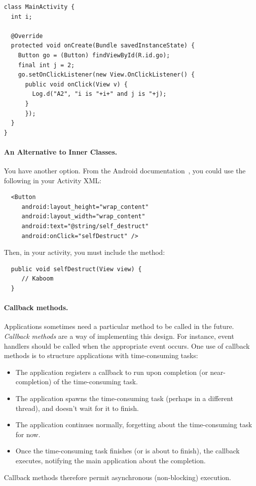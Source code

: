 {\small
\begin{verbatim}
class MainActivity {
  int i;

  @Override
  protected void onCreate(Bundle savedInstanceState) {
    Button go = (Button) findViewById(R.id.go);
    final int j = 2;
    go.setOnClickListener(new View.OnClickListener() {
      public void onClick(View v) {
        Log.d("A2", "i is "+i+" and j is "+j);
      }
      }); 
  }
}
\end{verbatim}
}

\paragraph{An Alternative to Inner Classes.}
You have another option. From the Android documentation~\cite{android:button}, you could use the following
in your Activity XML:
\begin{verbatim}
  <Button
     android:layout_height="wrap_content"
     android:layout_width="wrap_content"
     android:text="@string/self_destruct"
     android:onClick="selfDestruct" />
\end{verbatim}

Then, in your activity, you must include the method:
\begin{verbatim}
  public void selfDestruct(View view) {
     // Kaboom
  }
\end{verbatim}

\paragraph{Callback methods.} Applications sometimes need a particular
method to be called in the future. \emph{Callback methods} are a way of
implementing this design. For instance, event handlers should be called 
when the appropriate event occurs. 
One use of callback methods is to structure applications with 
time-consuming tasks:
\begin{itemize}
\item The application registers a callback to run upon completion (or
  near-completion) of the time-consuming task.
\item The application spawns the time-consuming task (perhaps in a
  different thread), and doesn't wait for it to finish.
\item The application continues normally, forgetting about the
  time-consuming task for now.
\item Once the time-consuming task finishes (or is about to finish),
  the callback executes, notifying the main application about the
  completion.
\end{itemize}
Callback methods therefore permit asynchronous (non-blocking) execution.

